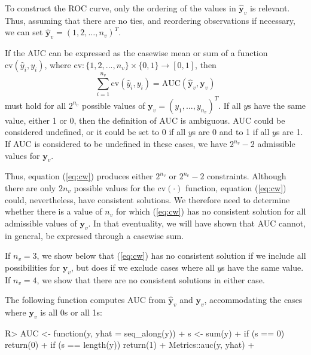 \documentclass[
]{jss}
\begin{document}
To construct the ROC curve, only the ordering of the values in
\(\mathbf{\widehat{y}}_v\) is relevant. Thus, assuming that there are no
ties, and reordering observations if necessary, we can set
\(\mathbf{\widehat{y}}_v = (1, 2, \ldots, n_v)^T\).

If the AUC can be expressed as the casewise mean or sum of a function
\(\mathrm{cv}(\widehat{y}_i,y_i)\), where
\(\mathrm{cv}: \{1,2,...,n_v\}\times\{0,1\} \rightarrow [0,1]\), then
\begin{equation}
\label{eq:cw}
\tag{1}
\sum_{i=1}^{n_v} \mathrm{cv}(\widehat{y}_i,y_i) = \mathrm{AUC}(\mathbf{\widehat{y}}_v,\mathbf{y}_v)
\end{equation} must hold for all \(2^{n_v}\) possible values of
\(\mathbf{y}_v = (y_1,...,y_{n_v})^T\). If all \(y\mathrm{s}\) have the
same value, either 1 or 0, then the definition of AUC is ambiguous. AUC
could be considered undefined, or it could be set to 0 if all \(y\)s are
0 and to 1 if all \(y\)s are 1. If AUC is considered to be undefined in
these cases, we have \(2^{n_v} - 2\) admissible values for
\(\mathbf{y}_v\).

Thus, equation (\ref{eq:cw}) produces either \(2^{n_v}\) or
\(2^{n_v}-2\) constraints. Although there are only \(2n_v\) possible
values for the \(\mathrm{cv(\cdot)}\) function, equation (\ref{eq:cw})
could, nevertheless, have consistent solutions. We therefore need to
determine whether there is a value of \(n_v\) for which (\ref{eq:cw})
has no consistent solution for all admissible values of
\(\mathbf{y}_v\). In that eventuality, we will have shown that AUC
cannot, in general, be expressed through a casewise sum.

If \(n_v=3\), we show below that (\ref{eq:cw}) has no consistent
solution if we include all possibilities for \(\mathbf{y}_v\), but does
if we exclude cases where all \(y\)s have the same value. If \(n_v=4\),
we show that there are no consistent solutions in either case.

The following  function computes AUC from
\(\mathbf{\widehat{y}}_v\) and \(\mathbf{y}_v\), accommodating the cases
where \(\mathbf{y}_v\) is all 0s or all 1s:

\begin{CodeChunk}
\begin{CodeInput}
R> AUC <- function(y, yhat = seq_along(y)) {
+   s <- sum(y)
+   if (s == 0) return(0)
+   if (s == length(y)) return(1)
+   Metrics::auc(y, yhat)
+ }
\end{CodeInput}
\end{CodeChunk}
\end{document}
